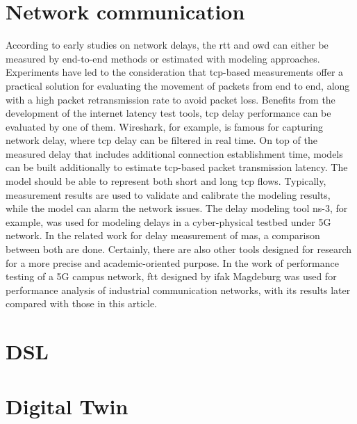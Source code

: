 \section{Network communication}
According to early studies on network delays, the \gls{rtt} and \gls{owd} 
can either be measured by end-to-end methods or estimated with modeling 
approaches. Experiments have led to the consideration that \gls{tcp}-based 
measurements offer a practical solution for evaluating the movement of 
packets from end to end, along with a high packet retransmission rate 
to avoid packet loss\cite{paxson_end--end_1999}. Benefits from 
the development of the internet latency test tools, \gls{tcp} delay 
performance can be evaluated by one of them. Wireshark, for example, is famous 
for capturing network delay, where \gls{tcp} delay can be filtered in real 
time\cite{dsouza_transmission_2020}.
On top of the measured delay 
that includes additional connection establishment time, 
models can be built additionally to estimate 
\gls{tcp}-based packet transmission latency. The model should be able to 
represent both short and long \gls{tcp} flows\cite{luan_estimating_2019}. 
Typically, measurement results are used to validate and calibrate the modeling 
results, while the model can alarm the network issues. The delay modeling tool 
ns-3, for example, was used for modeling delays in a cyber-physical 
testbed under 5G network\cite{adrah_real-time_2022}.
In the related work 
for delay measurement of \gls{mas}, a comparison between both are done\cite{vogel-heuser_delay_2023}.
Certainly, there are also other tools designed for research for a more 
precise and academic-oriented purpose. In the work of performance testing 
of a 5G campus network, \gls{ftt} designed by ifak Magdeburg was used 
for performance analysis of industrial communication networks\cite{cainelli_performance_2023}, 
with its results later compared with those in this article.



\section{DSL}

\section{Digital Twin}


